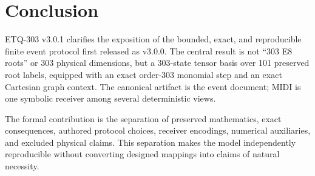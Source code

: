 \documentclass[11pt,a4paper]{article}
\theoremstyle{definition}
\begin{document}
\section{Conclusion}
ETQ-303 v3.0.1 clarifies the exposition of the bounded, exact, and reproducible finite event protocol first released as v3.0.0. The central result is not ``303 E8 roots'' or 303 physical dimensions, but a 303-state tensor basis over 101 preserved root labels, equipped with an exact order-303 monomial step and an exact Cartesian graph context. The canonical artifact is the event document; MIDI is one symbolic receiver among several deterministic views.

The formal contribution is the separation of preserved mathematics, exact consequences, authored protocol choices, receiver encodings, numerical auxiliaries, and excluded physical claims. This separation makes the model independently reproducible without converting designed mappings into claims of natural necessity.

\appendix
\end{document}
